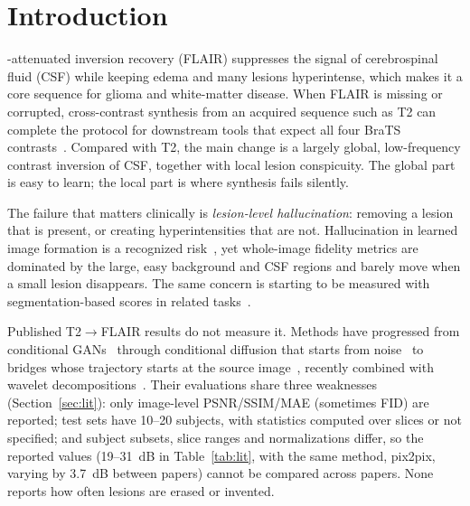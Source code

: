 \documentclass[journal]{IEEEtran}
\begin{document}
\section{Introduction}
-attenuated inversion recovery (FLAIR) suppresses the signal of cerebrospinal fluid (CSF) while
keeping edema and many lesions hyperintense, which makes it a core sequence for glioma and white-matter disease. When FLAIR
is missing or corrupted, cross-contrast synthesis from an acquired sequence such as T2 can complete the protocol for
downstream tools that expect all four BraTS contrasts~\cite{menze2015brats,baid2021brats}. Compared with T2, the main change
is a largely global, low-frequency contrast inversion of CSF, together with local lesion conspicuity. The global part is
easy to learn; the local part is where synthesis fails silently.

The failure that matters clinically is \emph{lesion-level hallucination}: removing a lesion that is present, or creating
hyperintensities that are not. Hallucination in learned image formation is a recognized risk~\cite{bhadra2021hallucinations},
yet whole-image fidelity metrics are dominated by the large, easy background and CSF regions and barely move when a small
lesion disappears. The same concern is starting to be measured with segmentation-based scores in related
tasks~\cite{kim2026mpflow}.

Published T2$\to$FLAIR results do not measure it. Methods have progressed from conditional
GANs~\cite{isola2017pix2pix,dar2019pgan,dalmaz2022resvit} through conditional diffusion that starts from
noise~\cite{ho2020ddpm,ozbey2023syndiff} to bridges whose trajectory starts at the source image~\cite{li2023bbdm,liu2023i2sb,arslan2025selfrdb},
recently combined with wavelet decompositions~\cite{jiang2025fadm,yang2026wrb}. Their evaluations share three weaknesses
(Section~\ref{sec:lit}): only image-level PSNR/SSIM/MAE (sometimes FID) are reported; test sets have 10--20 subjects, with statistics computed over slices or not specified; and subject subsets, slice ranges and normalizations differ, so the reported values (19--31~dB in Table~\ref{tab:lit}, with the same method, pix2pix, varying by 3.7~dB between papers) cannot be compared across papers. None reports how often lesions are erased or invented.
\end{document}
